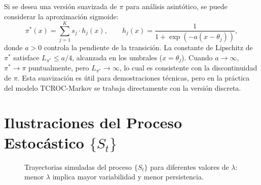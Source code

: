 \begin{appendices}
Si se desea una versión suavizada de $\pi$ para análisis
asintótico, se puede considerar la aproximación sigmoide:
\[
\pi^*(x) = \sum_{j=1}^{K} s_j \cdot h_j(x), \qquad
h_j(x) = \frac{1}{1 + \exp(-a(x - \theta_j))},
\]
donde $a > 0$ controla la pendiente de la transición.
La constante de Lipschitz de $\pi^*$ satisface
$L_{\pi^*} \leq a/4$, alcanzada en los umbrales ($x = \theta_j$).
Cuando $a \to \infty$, $\pi^* \to \pi$ puntualmente, pero
$L_{\pi^*} \to \infty$, lo cual es consistente con la
discontinuidad de $\pi$.  Esta suavización es útil para
demostraciones técnicas, pero en la práctica del modelo
TCROC-Markov se trabaja directamente con la versión discreta.

\section{Ilustraciones del Proceso Estocástico \texorpdfstring{$\{S_t\}$}{St}}
\label{apx:figuras_proceso_st}

\begin{figure}[htbp]
\centering
{}
\caption{Trayectorias simuladas del proceso \( \{S_t\} \) para diferentes valores de \( \lambda \): menor \( \lambda \) implica mayor variabilidad y menor persistencia.}
\label{fig:apx_st_trayectorias}
\end{figure}

\begin{figure}[htbp]
\centering
{}
\end{figure}
\end{appendices}
